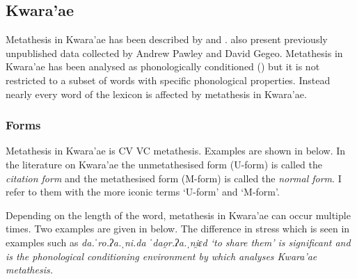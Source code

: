 \subsection{Kwara'ae}\label{sec:Kwa}
Metathesis in Kwara'ae has been described by
\citet{so80} and \citet{he04,he05}.
\citet{blga98} also present previously unpublished data
collected by Andrew Pawley and David Gegeo.
Metathesis in Kwara'ae has been analysed as phonologically conditioned ()
but it is not restricted to a subset of words with specific phonological properties.
Instead nearly every word of the lexicon is affected by metathesis in Kwara'ae.

\subsubsection{Forms}
Metathesis in Kwara'ae is CV {\ra} VC metathesis.
Examples are shown in  below.
In the literature on Kwara'ae the unmetathesised
form (U-form) is called the \emph{citation form} and the metathesised form
(M-form) is called the \emph{normal form}.
I refer to them with the more iconic terms `U-form' and `M-form'.

\begin{exe}
	\label{ex:KwVCV->VVC}
\end{exe}

Depending on the length of the word,
metathesis in Kwara'ae can occur multiple times.
Two examples are given in  below.
The difference in stress which is seen in examples such as
\it{da.ˈro.ʔa.ˌni.da} {\ra} \it{ˈdao̯r.ʔa.ˌni̯ɛd} `to share them'
is significant and is the phonological conditioning environment
by which \cite{he04} analyses Kwara'ae metathesis.

\begin{exe}
	\label{ex:MulMetKwa}
\end{exe}

